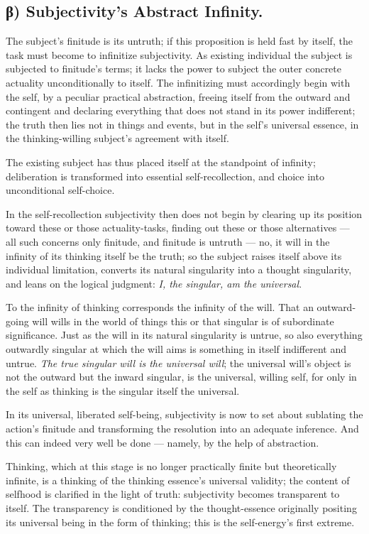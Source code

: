 \documentclass[12pt]{book}
\begin{document}
\subsection*{β) Subjectivity's Abstract Infinity.}

The subject's finitude is its untruth; if this proposition is held
fast by itself, the task must become to infinitize subjectivity. As
existing individual the subject is subjected to finitude's terms; it
lacks the power to subject the outer concrete actuality
unconditionally to itself. The infinitizing must accordingly begin
with the self, by a peculiar practical abstraction, freeing itself
from the outward and contingent and declaring everything that does
not stand in its power indifferent; the truth then lies not in
things and events, but in the self's universal essence, in the
thinking-willing subject's agreement with itself.

The existing subject has thus placed itself at the standpoint of
infinity; deliberation is transformed into essential
self-recollection, and choice into unconditional self-choice.

In the self-recollection subjectivity then does not begin by
clearing up its position toward these or those actuality-tasks,
finding out these or those alternatives --- all such concerns only
finitude, and finitude is untruth --- no, it will in the infinity of
its thinking itself be the truth; so the subject raises itself above
its individual limitation, converts its natural singularity into a
thought singularity, and leans on the logical judgment: \emph{I, the
singular, am the universal}.

To the infinity of thinking corresponds the infinity of the will.
That an outward-going will wills in the world of things this or that
singular is of subordinate significance. Just as the will in its
natural singularity is untrue, so also everything outwardly singular
at which the will aims is something in itself indifferent and
untrue. \emph{The true singular will is the universal will}; the
universal will's object is not the
outward but the inward singular, is the universal, willing self, for
only in the self as thinking is the singular itself the universal.

In its universal, liberated self-being, subjectivity is now to set
about sublating the action's finitude and transforming the
resolution into an adequate inference. And this can indeed very well
be done --- namely, by the help of abstraction.

Thinking, which at this stage is no longer practically finite but
theoretically infinite, is a thinking of the thinking essence's
universal validity; the content of selfhood is clarified in the
light of truth: subjectivity becomes transparent to itself. The
transparency is conditioned by the thought-essence originally
positing its universal being in the form of thinking; this is the
self-energy's first extreme.
\end{document}
